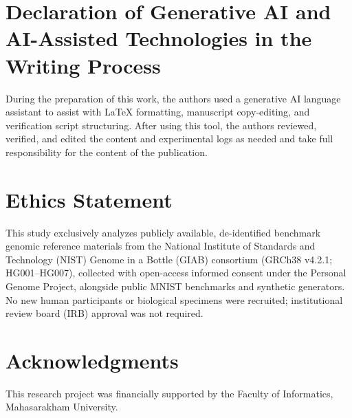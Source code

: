 \documentclass[10pt,a4paper]{article}
\begin{document}
\section*{Declaration of Generative AI and AI-Assisted Technologies in the Writing Process}
During the preparation of this work, the authors used a generative AI language assistant to assist with LaTeX formatting, manuscript copy-editing, and verification script structuring. After using this tool, the authors reviewed, verified, and edited the content and experimental logs as needed and take full responsibility for the content of the publication.

\section*{Ethics Statement}
This study exclusively analyzes publicly available, de-identified benchmark genomic reference materials from the National Institute of Standards and Technology (NIST) Genome in a Bottle (GIAB) consortium (GRCh38 v4.2.1; HG001--HG007), collected with open-access informed consent under the Personal Genome Project, alongside public MNIST benchmarks and synthetic generators. No new human participants or biological specimens were recruited; institutional review board (IRB) approval was not required.

\section*{Acknowledgments}
This research project was financially supported by the Faculty of Informatics, Mahasarakham University.
\end{document}
